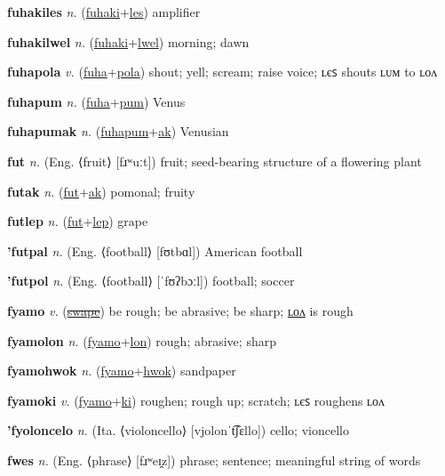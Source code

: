 \textbf{\hypertarget{fuhakiles}{fuhakiles}} \textit{n.} (\hyperlink{fuhaki}{fuhaki}+\allowbreak \hyperlink{les}{les})
amplifier

\textbf{\hypertarget{fuhakilwel}{fuhakilwel}} \textit{n.} (\hyperlink{fuhaki}{fuhaki}+\allowbreak \hyperlink{lwel}{lwel})
morning; dawn

\textbf{\hypertarget{fuhapola}{fuhapola}} \textit{v.} (\hyperlink{fuha}{fuha}+\allowbreak \hyperlink{pola}{pola})
shout; yell; scream; raise voice; ʟєꜱ shouts ʟᴜᴍ to ʟᴏᴧ

\textbf{\hypertarget{fuhapum}{fuhapum}} \textit{n.} (\hyperlink{fuha}{fuha}+\allowbreak \hyperlink{pum}{pum})
Venus

\textbf{\hypertarget{fuhapumak}{fuhapumak}} \textit{n.} (\hyperlink{fuhapum}{fuhapum}+\allowbreak \hyperlink{ak}{ak})
Venusian

\textbf{\hypertarget{fut}{fut}} \textit{n.} (Eng. ⟨fruit⟩ [fɹʷuːt])
fruit; seed-bearing structure of a flowering plant

\textbf{\hypertarget{futak}{futak}} \textit{n.} (\hyperlink{fut}{fut}+\allowbreak \hyperlink{ak}{ak})
pomonal; fruity

\textbf{\hypertarget{futlep}{futlep}} \textit{n.} (\hyperlink{fut}{fut}+\allowbreak \hyperlink{lep}{lep})
grape

\textbf{\hypertarget{'futpal}{'futpal}} \textit{n.} (Eng. ⟨football⟩ [fʊtbɑl])
American football

\textbf{\hypertarget{'futpol}{'futpol}} \textit{n.} (Eng. ⟨football⟩ [ˈfʊʔbɔːl])
football; soccer

\textbf{\hypertarget{fyamo}{fyamo}} \textit{v.} (\hyperlink{swape}{\sout{swape}})
be rough; be abrasive; be sharp; \hyperlink{fyamolon}{ʟᴏᴧ} is rough

\textbf{\hypertarget{fyamolon}{fyamolon}} \textit{n.} (\hyperlink{fyamo}{fyamo}+\allowbreak \hyperlink{lon}{lon})
rough; abrasive; sharp

\textbf{\hypertarget{fyamohwok}{fyamohwok}} \textit{n.} (\hyperlink{fyamo}{fyamo}+\allowbreak \hyperlink{hwok}{hwok})
sandpaper

\textbf{\hypertarget{fyamoki}{fyamoki}} \textit{v.} (\hyperlink{fyamo}{fyamo}+\allowbreak \hyperlink{ki}{ki})
roughen; rough up; scratch; ʟєꜱ roughens ʟᴏᴧ

\textbf{\hypertarget{'fyoloncelo}{'fyoloncelo}} \textit{n.} (Ita. ⟨violoncello⟩ [vjolonˈt͡ʃɛllo])
cello; vioncello

\textbf{\hypertarget{fwes}{fwes}} \textit{n.} (Eng. ⟨phrase⟩ [fɹʷeɪ̯z])
phrase; sentence; meaningful string of words

